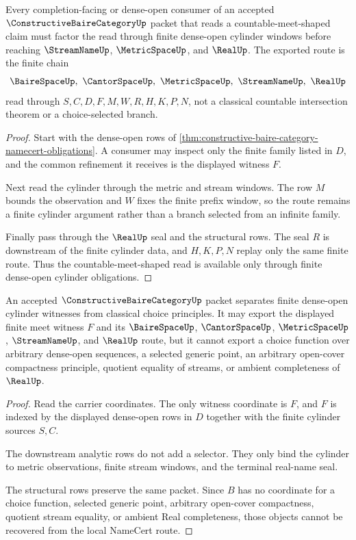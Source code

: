 \begin{theorem}
\label{thm:constructive-baire-category-countable-meet-route}
Every completion-facing or dense-open consumer of an accepted $\ConstructiveBaireCategoryUp$ packet that reads a countable-meet-shaped claim must factor the read through finite dense-open cylinder windows before reaching $\StreamNameUp$, $\MetricSpaceUp$, and $\RealUp$. The exported route is the finite chain
$$
\BaireSpaceUp,\ \CantorSpaceUp,\ \MetricSpaceUp,\ \StreamNameUp,\ \RealUp
$$
read through $S,C,D,F,M,W,R,H,K,P,N$, not a classical countable intersection theorem or a choice-selected branch.
\end{theorem}
\begin{proof}
Start with the dense-open rows of \autoref{thm:constructive-baire-category-namecert-obligations}. A consumer may inspect only the finite family listed in $D$, and the common refinement it receives is the displayed witness $F$.

Next read the cylinder through the metric and stream windows. The row $M$ bounds the observation and $W$ fixes the finite prefix window, so the route remains a finite cylinder argument rather than a branch selected from an infinite family.

Finally pass through the $\RealUp$ seal and the structural rows. The seal $R$ is downstream of the finite cylinder data, and $H,K,P,N$ replay only the same finite route. Thus the countable-meet-shaped read is available only through finite dense-open cylinder obligations.
\end{proof}

\begin{theorem}
\label{thm:constructive-baire-category-choice-boundary}
An accepted $\ConstructiveBaireCategoryUp$ packet separates finite dense-open cylinder witnesses from classical choice principles. It may export the displayed finite meet witness $F$ and its $\BaireSpaceUp$, $\CantorSpaceUp$, $\MetricSpaceUp$, $\StreamNameUp$, and $\RealUp$ route, but it cannot export a choice function over arbitrary dense-open sequences, a selected generic point, an arbitrary open-cover compactness principle, quotient equality of streams, or ambient completeness of $\RealUp$.
\end{theorem}
\begin{proof}
Read the carrier coordinates. The only witness coordinate is $F$, and $F$ is indexed by the displayed dense-open rows in $D$ together with the finite cylinder sources $S,C$.

The downstream analytic rows do not add a selector. They only bind the cylinder to metric observations, finite stream windows, and the terminal real-name seal.

The structural rows preserve the same packet. Since $B$ has no coordinate for a choice function, selected generic point, arbitrary open-cover compactness, quotient stream equality, or ambient Real completeness, those objects cannot be recovered from the local NameCert route.
\end{proof}

